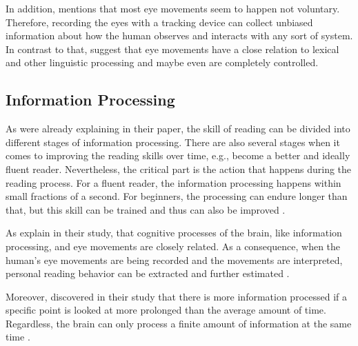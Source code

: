 In addition, \textcite{bruneau2002eyes} mentions that most eye movements seem to happen not voluntary. Therefore, recording the eyes with a tracking device can collect unbiased information about how the human observes and interacts with any sort of system.\\
In contrast to that, \textcite{clifton2016eye} suggest that eye movements have a close relation to lexical and other linguistic processing and maybe even are completely controlled.

\subsection{Information Processing}
\label{subsection:InformationProcessing}

As \textcite{laberge1974toward} were already explaining in their paper, the skill of reading can be divided into different stages of information processing. There are also several stages when it comes to improving the reading skills over time, e.g., become a better and ideally fluent reader. Nevertheless, the critical part is the action that happens during the reading process. For a fluent reader, the information processing happens within small fractions of a second. For beginners, the processing can endure longer than that, but this skill can be trained and thus can also be improved \autocite{laberge1974toward}.

As \textcite{biedert2010eyebook} explain in their study, that cognitive processes of the brain, like information processing, and eye movements are closely related.  As a consequence, when the human's eye movements are being recorded and the movements are interpreted, personal reading behavior can be extracted and further estimated \autocite{biedert2010eyebook}.

Moreover, \textcite{buscher2009you} discovered in their study that there is more information processed if a specific point is looked at more prolonged than the average amount of time. Regardless, the brain can only process a finite amount of information at the same time \autocite{biedert2010eyebook}.

